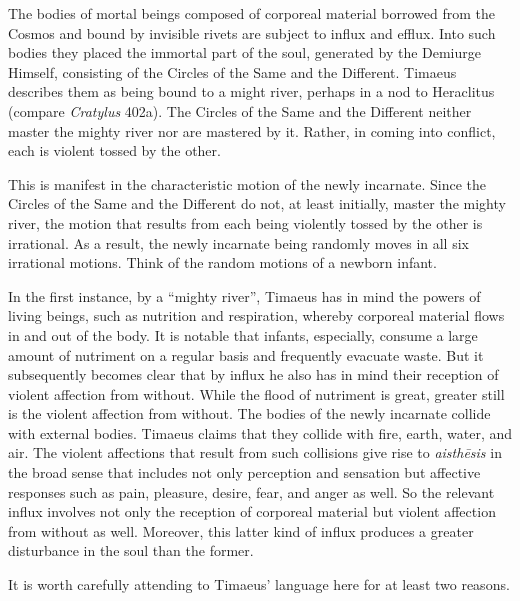 The bodies of mortal beings composed of corporeal material borrowed from the Cosmos and bound by invisible rivets are subject to influx and efflux. Into such bodies they placed the immortal part of the soul, generated by the Demiurge Himself, consisting of the Circles of the Same and the Different. Timaeus describes them as being bound to a might river, perhaps in a nod to Heraclitus (compare \emph{Cratylus} 402a). The Circles of the Same and the Different neither master the mighty river nor are mastered by it. Rather, in coming into conflict, each is violent tossed by the other.

This is manifest in the characteristic motion of the newly incarnate. Since the Circles of the Same and the Different do not, at least initially, master the mighty river, the motion that results from each being violently tossed by the other is irrational. As a result, the newly incarnate being randomly moves in all six irrational motions. Think of the random motions of a newborn infant.

In the first instance, by a ``mighty river'', Timaeus has in mind the powers of living beings, such as nutrition and respiration, whereby corporeal material flows in and out of the body. It is notable that infants, especially, consume a large amount of nutriment on a regular basis and frequently evacuate waste.  But it subsequently becomes clear that by influx he also has in mind their reception of violent affection from without. While the flood of nutriment is great, greater still is the violent affection from without. The bodies of the newly incarnate collide with external bodies. Timaeus claims that they collide with fire, earth, water, and air. The violent affections that result from such collisions give rise to \emph{aisthēsis} in the broad sense that includes not only perception and sensation but affective responses such as pain, pleasure, desire, fear, and anger as well. So the relevant influx involves not only the reception of corporeal material but violent affection from without as well. Moreover, this latter kind of influx produces a greater disturbance in the soul than the former.

It is worth carefully attending to Timaeus' language here for at least two reasons.

